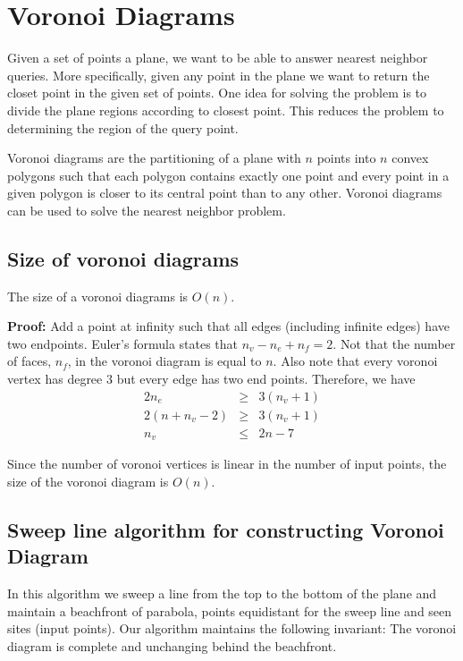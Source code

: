 \documentclass{article}
\begin{document}
\section{Voronoi Diagrams}

Given a set of points a plane, we want to be able to answer nearest neighbor queries. More specifically, given any point in the plane we want to return the closet point in the given set of points. One idea for solving the problem is to divide the plane regions according to closest point. This reduces the problem to determining the region of the query point.

Voronoi diagrams are the partitioning of a plane with $n$ points into $n$ convex polygons such that each polygon contains exactly one point and every point in a given polygon is closer to its central point than to any other. Voronoi diagrams can be used to solve the nearest neighbor problem.

\subsection{Size of voronoi diagrams}

The size of a voronoi diagrams is $O(n)$. 

\textbf{Proof:} Add a point at infinity such that all edges (including infinite edges) have two endpoints. Euler's formula states that $n_v - n_e + n_f = 2$.  Not that the number of faces, $n_f$, in the voronoi diagram is equal to $n$. Also note that every voronoi vertex has degree $3$ but every edge has two end points. Therefore, we have
\begin{eqnarray}
2 n_e &\geq & 3(n_v + 1)\nonumber \\
2(n + n_v - 2) &\geq& 3(n_v + 1)\nonumber \\
n_v &\leq & 2n - 7
\end{eqnarray}

Since the number of voronoi vertices is linear in the number of input points, the size of the voronoi diagram is $O(n)$.


\subsection{Sweep line algorithm for constructing Voronoi Diagram}

In this algorithm we sweep a line from the top to the bottom of the plane and maintain a beachfront of parabola, points equidistant for the sweep line and seen sites (input points).  Our algorithm maintains the following invariant: The voronoi diagram is complete and unchanging behind the beachfront. 
\end{document}
